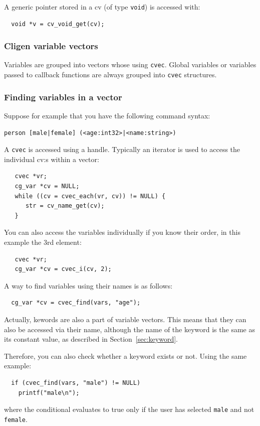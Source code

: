\documentclass[a4paper, 10pt] {article}
\begin{document}
A generic pointer stored in a cv (of type {\tt void}) is accessed with:
\begin{verbatim}
  void *v = cv_void_get(cv);
\end{verbatim}


\subsubsection{Cligen variable vectors}
Variables are grouped into vectors whose using {\tt cvec}. Global variables or variables
passed to callback functions are always grouped into {\tt cvec}
structures.

\subsubsection{Finding variables in a vector}
\label{sec:find}

Suppose for example that you have the following command syntax:
\begin{verbatim}
person [male|female] (<age:int32>|<name:string>)
\end{verbatim}

A {\tt cvec} is accessed using a handle. Typically an iterator is used to access the individual cv:s within a vector:
\begin{verbatim}
   cvec *vr;
   cg_var *cv = NULL;
   while ((cv = cvec_each(vr, cv)) != NULL) {
      str = cv_name_get(cv);
   }
\end{verbatim}

You can also access the variables individually if you know their order, in this example the 3rd element:
\begin{verbatim}
   cvec *vr;
   cg_var *cv = cvec_i(cv, 2);
\end{verbatim}

A way to find variables using their names is as follows:
\begin{verbatim}
  cg_var *cv = cvec_find(vars, "age");
\end{verbatim}

Actually, kewords are also a part of variable vectors. This means that
they can also be accessed via their name, although the name of the
keyword is the same as its constant value, as described in
Section~\ref{sec:keyword}.

Therefore, you can also check whether a keyword exists or not. Using the same example:
\begin{verbatim}
  if (cvec_find(vars, "male") != NULL)
    printf("male\n");
\end{verbatim}
where the conditional evaluates to true only if the user has selected
{\tt male} and not {\tt female}.
\end{document}
